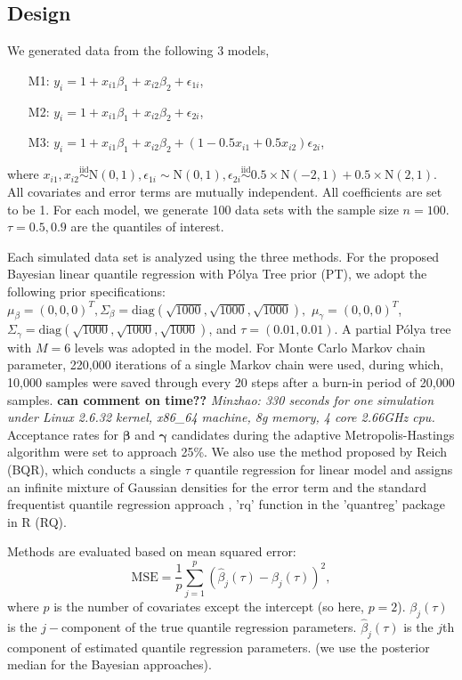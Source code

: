 \documentclass[12pt]{article}
\newcommand{\polya}{P\'{o}lya}
\begin{document}
\subsection{Design}
We generated data from the following 3 models,
\begin{itemize}
\item [M1:] $y_i = 1 + x_{i1}\beta_1 + x_{i2}\beta_2 + \epsilon_{1i}$,
\item [M2:] $y_i = 1 + x_{i1}\beta_1 + x_{i2}\beta_2 + \epsilon_{2i}$,
\item [M3:]  $y_i = 1 + x_{i1}\beta_1 + x_{i2}\beta_2 +
  (1-0.5x_{i1}+0.5x_{i2}) \epsilon_{2i}$, 
\end{itemize}
where $x_{i1} , x_{i2} \stackrel{\text{iid}}{\sim} \mathrm{N}(0,1),
\epsilon_{1i} \sim \mathrm{N}(0,1), \epsilon_{2i} 
\stackrel{\text{iid}}{\sim} 0.5 \times \mathrm{N}(-2,1) + 
0.5 \times \mathrm{N}(2,1)
$. All covariates and error terms are mutually independent. All
coefficients are set to be 1. For each model, we generate 100 data
sets with the sample size $n=100$. $\tau=0.5, 0.9$ are the quantiles
of interest.  

Each simulated data set is analyzed using the three methods. For the proposed
Bayesian linear quantile regression with \polya{} Tree prior (PT),
we adopt the following prior specifications: $\mu_{\beta} = (0,0,0)^T, 
\Sigma_{\beta}=\text{diag} (\sqrt{1000},\sqrt{1000},\sqrt{1000}), $
$\mu_{\gamma} = (0,0,0)^T$, 
$\Sigma_{\gamma}=\text{diag} (\sqrt{1000},\sqrt{1000},\sqrt{1000}) $,
and $\tau=(0.01, 0.01)$. A partial \polya{} tree with $M=6$ levels was adopted
in the model. For Monte Carlo Markov chain parameter, 220,000
iterations of a single Markov chain were used, during which, 10,000
samples were saved through every 20 steps after a burn-in period of
20,000 samples. {\bf can comment on time??} {\it Minzhao: 330 seconds
  for one simulation
  under Linux 2.6.32 kernel, x86\_64 machine, 8g memory, 4 core
  2.66GHz cpu.} Acceptance rates for $\bm{\beta}$ and $\bm{\gamma}$ candidates
during the adaptive Metropolis-Hastings algorithm were set to approach
25\%.  
We also use the method proposed by Reich (BQR),
which conducts a single $\tau$
quantile regression for linear model and assigns an infinite mixture
of Gaussian densities for the error term and the
standard frequentist quantile regression approach , 'rq' function in
the 'quantreg' package in R (RQ). 

Methods are evaluated  based on mean squared error: 
\begin{displaymath}
  \text{MSE}  = \frac{1}{p} \sum_{j=1}^p (\hat{\beta}_j(\tau) -
  \beta_j(\tau))^2, 
\end{displaymath}
where $p$ is the number of covariates except the intercept (so here,
$p=2$). $\beta_j(\tau)$ is the 
$j-$component of the true quantile regression
parameters. $\hat{\beta}_j(\tau)$ is the  $j$th component of estimated
quantile regression parameters. (we use the posterior median for
the Bayesian approaches).
\end{document}
